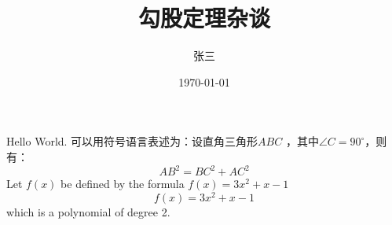 \documentclass{article}%
\title{\heiti 勾股定理杂谈}
\author{\kaishu 张三}
\date{\today}
\newcommand\degree{^\circ}
\begin{document}
	\maketitle


	
	Hello World.
	可以用符号语言表述为：设直角三角形$ABC$
	，其中$\angle C=90\degree$，则有：
	\begin{equation}	
		AB^2 = BC^2 + AC^2
	\end{equation}	%
	Let $f(x)$ be defined by the formula 
	$f(x)=3x^2+x-1$
	$$f(x)=3x^2+x-1$$  %
	which is a polynomial of degree 2.
\end{document}
